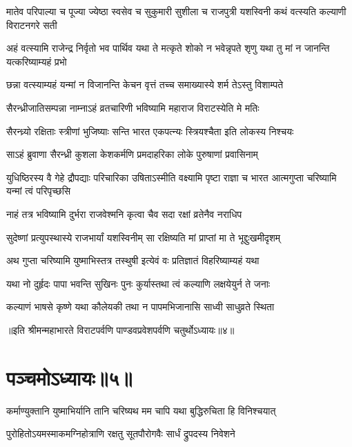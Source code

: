 \threelineshloka
{मातेव परिपाल्या च पूज्या ज्येष्ठा स्वसेव च}
{सुकुमारी सुशीला च राजपुत्री यशस्विनी}
{कथं वत्स्यति कल्याणी विराटनगरे सती}




\threelineshloka
{अहं वत्स्यामि राजेन्द्र निर्वृतो भव पार्थिव}
{यथा ते मत्कृते शोको न भवेन्नृपते शृणु}
{यथा तु मां न जानन्ति यत्करिष्याम्यहं प्रभो}


\twolineshloka
{छन्ना वत्स्याम्यहं यन्मां न विजानन्ति केचन}
{वृत्तं तच्च समाख्यास्ये शर्म तेऽस्तु विशाम्पते}


\twolineshloka
{सैरन्ध्रीजातिसम्पन्ना नाम्नाऽहं व्रतचारिणी}
{भविष्यामि महाराज विराटस्येति मे मतिः}


\twolineshloka
{सैरन्ध्र्यो रक्षिताः स्त्रीणां भुजिष्याः सन्ति भारत}
{एकपत्न्यः स्त्रियश्चैता इति लोकस्य निश्चयः}


\twolineshloka
{साऽहं ब्रुवाणा सैरन्ध्री कुशला केशकर्मणि}
{प्रमदाहरिका लोके पुरुषाणां प्रवासिनाम्}


\threelineshloka
{युधिष्ठिरस्य वै गेहे द्रौपद्याः परिचारिका}
{उषिताऽस्मीति वक्ष्यामि पृष्टा राज्ञा च भारत}
{आत्मगुप्ता चरिष्यामि यन्मां त्वं परिपृच्छसि}


\twolineshloka
{नाहं तत्र भविष्यामि दुर्भरा राजवेश्मनि}
{कृत्वा चैव सदा रक्षां व्रतेनैव नराधिप}


\twolineshloka
{सुदेष्णां प्रत्युपस्थास्ये राजभार्यां यशस्विनीम्}
{सा रक्षिष्यति मां प्राप्तां मा ते भूद्दुःखमीदृशम्}


\twolineshloka
{अथ गुप्ता चरिष्यामि युष्माभिस्तत्र तस्थुषी}
{इत्येवं वः प्रतिज्ञातं विहरिष्याम्यहं यथा}




\twolineshloka
{यथा नो दुर्हृदः पापा भवन्ति सुखिनः पुनः}
{कुर्यास्तथा त्वं कल्याणि लक्षयेयुर्न ते जनाः}


\twolineshloka
{कल्याणं भाषसे कृष्णे यथा कौलेयकी तथा}
{न पापमभिजानासि साध्वी साधुव्रते स्थिता}

॥इति श्रीमन्महाभारते विराटपर्वणि पाण्डवप्रवेशपर्वणि चतुर्थोऽध्यायः॥४॥

\chapter{पञ्चमोऽध्यायः॥५॥}

\twolineshloka
{कर्माण्युक्तानि युष्माभिर्यानि तानि चरिष्यथ}
{मम चापि यथा बुद्धिरुचिता हि विनिश्चयात्}


\twolineshloka
{पुरोहितोऽयमस्माकमग्निहोत्राणि रक्षतु}
{सूतपौरोगवैः सार्धं द्रुपदस्य निवेशने}


